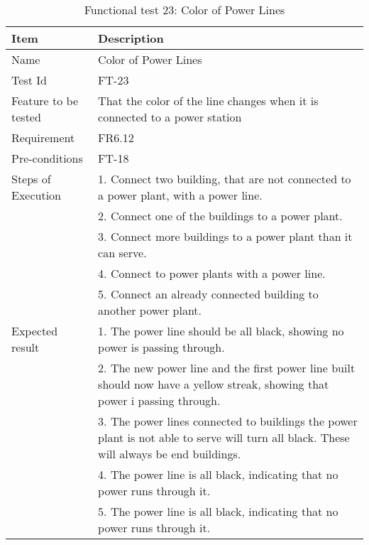 \begin{table}[H]
\centering
	\begin{tabular}{ l | p{8cm} }
		\hline
		\rowcolor{lightgray}
		{\bf Item} & {\bf Description} \\ \hline
		Name &  Color of Power Lines \\ 
		Test Id & FT-23 \\ 
		Feature to be tested & That the color of the line changes when it is connected to a power station \\ 
		Requirement & FR6.12 \\ 
		Pre-conditions & FT-18 \\ 
		Steps of Execution & 1. Connect two building, that are not connected to a power plant, with a power line. \\ 
		& 2. Connect one of the buildings to a power plant. \\
		& 3. Connect more buildings to a power plant than it can serve. \\
		& 4. Connect to power plants with a power line. \\
		& 5. Connect an already connected building to another power plant. \\
		Expected result & 1. The power line should be all black, showing no power is passing through. \\
		& 2. The new power line and the first power line built should now have a yellow streak, showing that power i passing through. \\
		& 3. The power lines connected to buildings the power plant is not able to serve will turn all black. These will always be end buildings. \\
		& 4. The power line is all black, indicating that no power runs through it. \\
		& 5. The power line is all black, indicating that no power runs through it. \\
		\hline
	\end{tabular}
	\caption{Functional test 23: Color of Power Lines}
\end{table}

